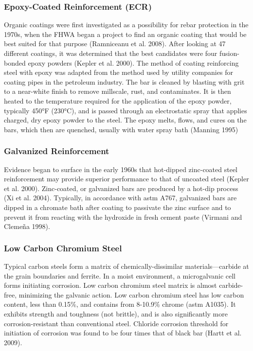 \subsubsection{Epoxy-Coated Reinforcement (ECR)}

Organic coatings were first investigated as a possibility for rebar protection in the 1970s, when the FHWA began a project to find an organic coating that would be best suited for that purpose (Ramniceanu et al. 2008). After looking at 47 different coatings, it was determined that the best candidates were four fusion-bonded epoxy powders (Kepler et al. 2000). The method of coating reinforcing steel with epoxy was adapted from the method used by utility companies for coating pipes in the petroleum industry. The bar is cleaned by blasting with grit to a near-white finish to remove millscale, rust, and contaminates. It is then heated to the temperature required for the application of the epoxy powder, typically 450°F (230°C), and is passed through an electrostatic spray that applies charged, dry epoxy powder to the steel. The epoxy melts, flows, and cures on the bars, which then are quenched, usually with
water spray bath (Manning 1995)


\subsubsection{Galvanized Reinforcement}
Evidence began to surface in the early 1960s that hot-dipped zinc-coated steel reinforcement may provide superior performance to that of uncoated steel (Kepler et al. 2000). Zinc-coated, or galvanized bars are produced by a hot-dip process (Xi et al. 2004). Typically, in accordance with \acrshort*{astm} A767, galvanized bars are dipped in a chromate bath after coating to passivate the zinc surface and to prevent it from reacting with the hydroxide in fresh cement paste (Virmani and Clemeña 1998).


\subsubsection{Low Carbon Chromium Steel}
Typical carbon steels form a matrix of chemically-dissimilar materials—carbide at the grain boundaries and ferrite. In a moist environment, a microgalvanic cell forms initiating corrosion. Low carbon chromium steel matrix is almost carbide-free, minimizing the galvanic action. Low carbon chromium steel has low carbon content, less than 0.15\%, and contains from 8-10.9\% chrome (\acrshort*{astm} A1035). It exhibits strength and toughness (not brittle), and is also significantly more corrosion-resistant than conventional steel. Chloride corrosion threshold for initiation of corrosion was found to be four times that of black bar (Hartt et al. 2009).

